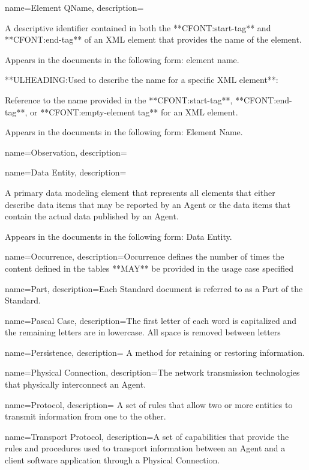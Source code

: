 {
    name={Element QName},
	description={
	A descriptive identifier contained in both the **CFONT:start-tag** and **CFONT:end-tag** of an XML element that provides the name of the element.

	Appears in the documents in the following form: element name.

	**ULHEADING:Used to describe the name for a specific XML element**:

	Reference to the name provided in the **CFONT:start-tag**, **CFONT:end-tag**, or **CFONT:empty-element tag** for an XML element.

	Appears in the documents in the following form: \gls{Element Name}.
}
}

{
    name={Observation},
	description={}
}

{
    name={Data Entity},
	description={
	A primary data modeling element that represents all elements that either describe data items that may be reported by an \gls{Agent} or the data items that contain the actual data published by an \gls{Agent}.

	Appears in the documents in the following form: \gls{Data Entity}.
}
}

{
    name={Occurrence},
	description={Occurrence defines the number of times the content defined in the tables **MAY** be provided in the usage case specified}
}

{
    name={Part},
	description={Each Standard document is referred to as a \gls{Part} of the Standard.}
}

{
    name={Pascal Case},
	description={The first letter of each word is capitalized and the remaining letters are in lowercase. All space is removed between letters}
}

{
    name={Persistence},
	description={
	A method for retaining or restoring information.
}
}

{
    name={Physical Connection},
	description={The network transmission technologies that physically interconnect an \gls{Agent}.}
}

{
    name={Protocol},
	description={
	A set of rules that allow two or more entities to transmit information from one to the other.
}
}

{
    name={Transport Protocol},
	description={A set of capabilities that provide the rules and procedures used to transport information between an \gls{Agent} and a client software application through a \gls{Physical Connection}.}
}

